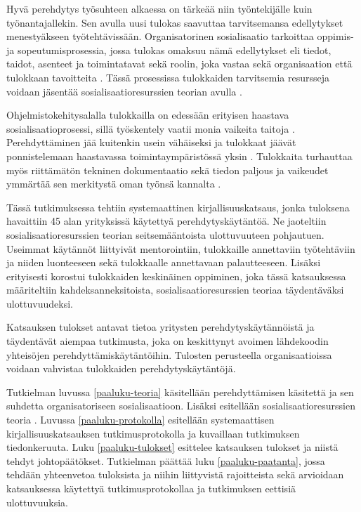 \documentclass[utf8]{gradu3}
\begin{document}
Hyvä perehdytys työsuhteen alkaessa on tärkeää niin työntekijälle kuin työnantajallekin. Sen avulla uusi tulokas saavuttaa tarvitsemansa edellytykset menestyäkseen työtehtävissään. Organisatorinen sosialisaatio tarkoittaa oppimis- ja sopeutumisprosessia, jossa tulokas omaksuu nämä edellytykset eli tiedot, taidot, asenteet ja toimintatavat sekä roolin, joka vastaa sekä organisaation että tulokkaan tavoitteita %
\parencites%
    [][]{wanberg-2012}%
    {chao-2012}%
\relax.
%
Tässä prosessissa tulokkaiden tarvitsemia resursseja voidaan jäsentää sosialisaatioresurssien teorian avulla \parencite{saks-gruman-2012}.

Ohjelmistokehitysalalla tulokkailla on edessään erityisen haastava sosialisaatioprosessi, sillä työskentely vaatii monia vaikeita taitoja
%
\parencites%
    [][]{swebok}%
    {gregory-ym-2020}%
    {begel-simon-2008-all-over-again}%
\relax.
%
Perehdyttäminen jää kuitenkin usein vähäiseksi ja tulokkaat jäävät ponnistelemaan haastavassa toimintaympäristössä yksin \parencite{begel-simon-2008}. Tulokkaita turhauttaa myös riittämätön tekninen dokumentaatio \parencite{ju-ym-2021} sekä tiedon paljous ja vaikeudet ymmärtää sen merkitystä oman työnsä kannalta \parencite{viviani-murphy-2019}.

Tässä tutkimuksessa tehtiin systemaattinen kirjallisuuskatsaus, jonka tuloksena havaittiin 45 alan yrityksissä käytettyä perehdytyskäytäntöä. Ne jaoteltiin sosialisaatioresurssien teorian \textcite{saks-gruman-2012} seitsemääntoista ulottuvuuteen pohjautuen. Useimmat käytännöt liittyivät mentorointiin, tulokkaille annettaviin työtehtäviin ja niiden luonteeseen sekä tulokkaalle annettavaan palautteeseen. Lisäksi erityisesti korostui tulokkaiden keskinäinen oppiminen, joka tässä katsauksessa määriteltiin kahdeksanneksitoista, sosialisaatioresurssien teoriaa täydentäväksi ulottuvuudeksi.

Katsauksen tulokset antavat tietoa yritysten perehdytyskäytännöistä ja täydentävät aiempaa tutkimusta, joka on keskittynyt avoimen lähdekoodin yhteisöjen perehdyttämiskäytäntöihin. Tulosten perusteella organisaatioissa voidaan vahvistaa tulokkaiden perehdytyskäytäntöjä.

Tutkielman luvussa \ref{paaluku-teoria} käsitellään perehdyttämisen käsitettä ja sen suhdetta organisatoriseen sosialisaatioon. Lisäksi esitellään sosialisaatioresurssien teoria \parencite{saks-gruman-2012}. Luvussa \ref{paaluku-protokolla} esitellään systemaattisen kirjallisuuskatsauksen tutkimusprotokolla ja kuvaillaan tutkimuksen tiedonkeruuta. Luku \ref{paaluku-tulokset} esittelee katsauksen tulokset ja niistä tehdyt johtopäätökset. Tutkielman päättää luku \ref{paaluku-paatanta}, jossa tehdään yhteenvetoa tuloksista ja niihin liittyvistä rajoitteista sekä arvioidaan katsauksessa käytettyä tutkimusprotokollaa ja tutkimuksen eettisiä ulottuvuuksia.
\end{document}

